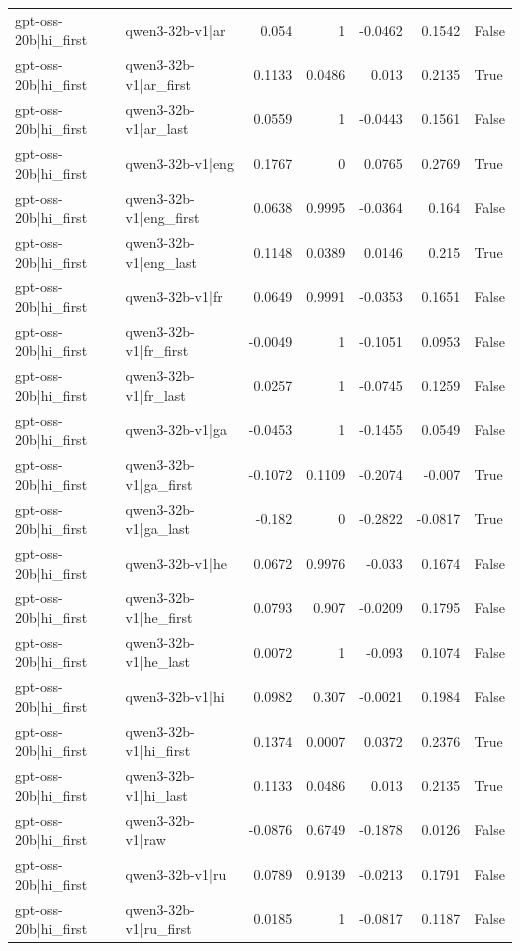 \begin{table}
\begin{tabular}{l l r r r r l}
gpt-oss-20b|hi_first & qwen3-32b-v1|ar & 0.054 & 1 & -0.0462 & 0.1542 & False \\
gpt-oss-20b|hi_first & qwen3-32b-v1|ar_first & 0.1133 & 0.0486 & 0.013 & 0.2135 & True \\
gpt-oss-20b|hi_first & qwen3-32b-v1|ar_last & 0.0559 & 1 & -0.0443 & 0.1561 & False \\
gpt-oss-20b|hi_first & qwen3-32b-v1|eng & 0.1767 & 0 & 0.0765 & 0.2769 & True \\
gpt-oss-20b|hi_first & qwen3-32b-v1|eng_first & 0.0638 & 0.9995 & -0.0364 & 0.164 & False \\
gpt-oss-20b|hi_first & qwen3-32b-v1|eng_last & 0.1148 & 0.0389 & 0.0146 & 0.215 & True \\
gpt-oss-20b|hi_first & qwen3-32b-v1|fr & 0.0649 & 0.9991 & -0.0353 & 0.1651 & False \\
gpt-oss-20b|hi_first & qwen3-32b-v1|fr_first & -0.0049 & 1 & -0.1051 & 0.0953 & False \\
gpt-oss-20b|hi_first & qwen3-32b-v1|fr_last & 0.0257 & 1 & -0.0745 & 0.1259 & False \\
gpt-oss-20b|hi_first & qwen3-32b-v1|ga & -0.0453 & 1 & -0.1455 & 0.0549 & False \\
gpt-oss-20b|hi_first & qwen3-32b-v1|ga_first & -0.1072 & 0.1109 & -0.2074 & -0.007 & True \\
gpt-oss-20b|hi_first & qwen3-32b-v1|ga_last & -0.182 & 0 & -0.2822 & -0.0817 & True \\
gpt-oss-20b|hi_first & qwen3-32b-v1|he & 0.0672 & 0.9976 & -0.033 & 0.1674 & False \\
gpt-oss-20b|hi_first & qwen3-32b-v1|he_first & 0.0793 & 0.907 & -0.0209 & 0.1795 & False \\
gpt-oss-20b|hi_first & qwen3-32b-v1|he_last & 0.0072 & 1 & -0.093 & 0.1074 & False \\
gpt-oss-20b|hi_first & qwen3-32b-v1|hi & 0.0982 & 0.307 & -0.0021 & 0.1984 & False \\
gpt-oss-20b|hi_first & qwen3-32b-v1|hi_first & 0.1374 & 0.0007 & 0.0372 & 0.2376 & True \\
gpt-oss-20b|hi_first & qwen3-32b-v1|hi_last & 0.1133 & 0.0486 & 0.013 & 0.2135 & True \\
gpt-oss-20b|hi_first & qwen3-32b-v1|raw & -0.0876 & 0.6749 & -0.1878 & 0.0126 & False \\
gpt-oss-20b|hi_first & qwen3-32b-v1|ru & 0.0789 & 0.9139 & -0.0213 & 0.1791 & False \\
gpt-oss-20b|hi_first & qwen3-32b-v1|ru_first & 0.0185 & 1 & -0.0817 & 0.1187 & False \\

\end{tabular}
\end{table}
